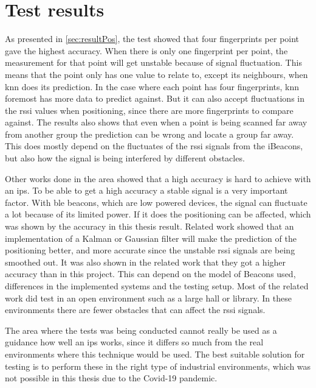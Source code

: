\section{Test results}\label{sec:discussionResult}
As presented in \cref{sec:resultPos}, the test showed that four fingerprints per point gave the highest accuracy.
When there is only one fingerprint per point, the measurement for that point will get unstable because of signal fluctuation.
This means that the point only has one value to relate to, except its neighbours, when \acrshort{knn} does its prediction.
In the case where each point has four fingerprints, \acrshort{knn} foremost has more data to predict against.
But it can also accept fluctuations in the \acrfull{rssi} values when positioning, since there are more fingerprints to compare against.
The results also shows that even when a point is being scanned far away from another group the prediction can be wrong and locate a group far away.
This does mostly depend on the fluctuates of the \acrshort{rssi} signals from the iBeacons, but also how the signal is being interfered by different obstacles.

\bigskip

Other works done in the area showed that a high accuracy is hard to achieve with an \acrshort{ips}.
To be able to get a high accuracy a stable signal is a very important factor.
With \acrlong{ble} beacons, which are low powered devices, the signal can fluctuate a lot because of its limited power.
If it does the positioning can be affected, which was shown by the accuracy in this thesis result.
Related work  showed that an implementation of a Kalman or Gaussian filter will make the prediction of the positioning better, and more accurate since the unstable \acrshort{rssi} signals are being smoothed out.
It was also shown in the related work that they got a higher accuracy than in this project.
This can depend on the model of Beacons used, differences in the implemented systems and the testing setup.
Most of the related work did test in an open environment such as a large hall or library.
In these environments there are fewer obstacles that can affect the \acrshort{rssi} signals.

\bigskip

The area where the tests was being conducted cannot really be used as a guidance how well an \acrshort{ips} works, since it differs so much from the real environments where this technique would be used.
The best suitable solution for testing is to perform these in the right type of industrial environments, which was not possible in this thesis due to the Covid-19 pandemic.

